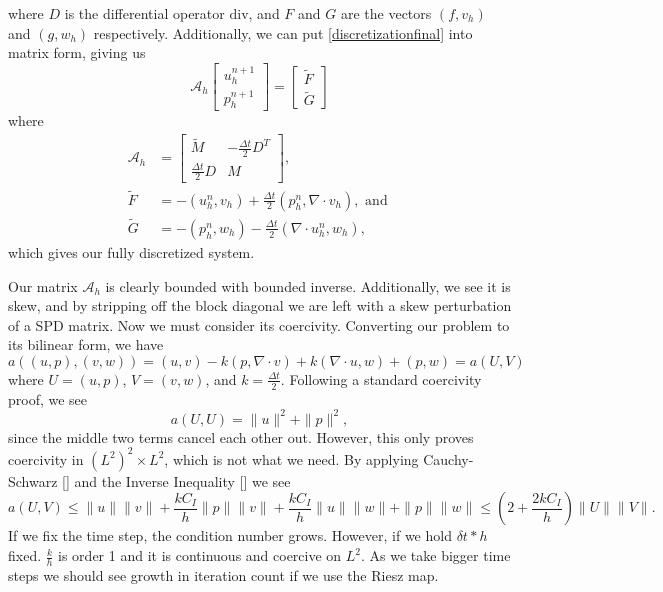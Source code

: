 \documentclass[11pt]{article}
\newcommand{\divv}{\mathrm{div}}
\begin{document}
where $D$ is the differential operator $\divv$, and $F$ and $G$ are the vectors $(f,v_h)$ and $(g,w_h)$ respectively. Additionally, we can put \eqref{discretizationfinal} into matrix form, giving us
\begin{equation}\label{FEcoeffoperator}
\mathscr{A}_h
\begin{bmatrix}
u^{n+1}_h \\
p^{n+1}_h
\end{bmatrix}
=
\begin{bmatrix}
\tilde{F}\\
\tilde{G}
\end{bmatrix}
\end{equation}
where
\begin{equation}\label{discretcoefop}
\begin{split}
\mathscr{A}_h &= \begin{bmatrix}
\tilde{M} & -\frac{\Delta t}{2}D^T \\
\frac{\Delta t}{2}D & M
\end{bmatrix},\\
\tilde{F} &= -\left(u^n_h, v_h\right) +\frac{\Delta t}{2}\left(p^n_h,\nabla \cdot v_h\right), \text{ and }\\
\tilde{G} &= -\left(p^n_h,w_h\right) - \frac{\Delta t}{2}\left(\nabla \cdot u^n_h,w_h\right),
\end{split}
\end{equation} which gives our fully discretized system.

Our matrix $\mathscr{A}_h$ is clearly bounded with bounded inverse. Additionally, we see it is skew, and by stripping off the block diagonal we are left with a skew perturbation of a SPD matrix. Now we must consider its coercivity. Converting our problem to its bilinear form, we have
\begin{equation}\label{bilinear}
a((u,p),(v,w)) = (u,v) - k(p, \nabla \cdot v) + k(\nabla \cdot u,w) + (p,w) = a(U,V)
\end{equation}
where $U = (u,p)$, $V = (v,w)$, and $k = \frac{\Delta t}{2}$. Following a standard coercivity proof, we see
\begin{equation}
a(U,U) = \|u\|^2 + \|p\|^2,
\end{equation}
since the middle two terms cancel each other out. However, this only proves coercivity in $(L^2)^2 \times L^2$, which is not what we need.
By applying Cauchy-Schwarz [] and the Inverse Inequality [] we see
\begin{equation}
a(U,V) \leq \|u\|\|v\| + \frac{kC_I}{h}\|p\|\|v\| + \frac{kC_I}{h}\|u\|\|w\| + \|p\|\|w\| \leq \left(2 + \frac{2kC_I}{h}\right)\|U\|\|V\|.
\end{equation}
If we fix the time step, the condition number grows. However, if we hold $\delta t * h$ fixed. $\frac{k}{h}$ is order 1 and it is continuous and coercive on $L^2$. As we take bigger time steps we should see growth in iteration count if we use the Riesz map.
\end{document}
